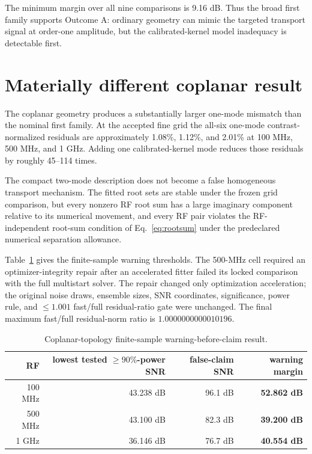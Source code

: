 \documentclass[11pt]{article}
\begin{document}
The minimum margin over all nine comparisons is 9.16 dB. Thus the broad first family supports Outcome A: ordinary geometry can mimic the targeted transport signal at order-one amplitude, but the calibrated-kernel model inadequacy is detectable first.

\section{Materially different coplanar result}

The coplanar geometry produces a substantially larger one-mode mismatch than the nominal first family. At the accepted fine grid the all-six one-mode contrast-normalized residuals are approximately 1.08\%, 1.12\%, and 2.01\% at 100 MHz, 500 MHz, and 1 GHz. Adding one calibrated-kernel mode reduces those residuals by roughly 45--114 times.

The compact two-mode description does not become a false homogeneous transport mechanism. The fitted root sets are stable under the frozen grid comparison, but every nonzero RF root sum has a large imaginary component relative to its numerical movement, and every RF pair violates the RF-independent root-sum condition of Eq.~\eqref{eq:rootsum} under the predeclared numerical separation allowance.

Table~\ref{tab:coplanar} gives the finite-sample warning thresholds. The 500-MHz cell required an optimizer-integrity repair after an accelerated fitter failed its locked comparison with the full multistart solver. The repair changed only optimization acceleration; the original noise draws, ensemble sizes, SNR coordinates, significance, power rule, and $\le1.001$ fast/full residual-ratio gate were unchanged. The final maximum fast/full residual-norm ratio is $1.0000000000010196$.

\begin{table}[H]
\centering
\caption{Coplanar-topology finite-sample warning-before-claim result.}
\label{tab:coplanar}
\begin{tabular}{rrrr}
\toprule
RF & lowest tested $\ge90\%$-power SNR & false-claim SNR & warning margin\\
\midrule
100 MHz & 43.238 dB & 96.1 dB & \textbf{52.862 dB}\\
500 MHz & 43.100 dB & 82.3 dB & \textbf{39.200 dB}\\
1 GHz & 36.146 dB & 76.7 dB & \textbf{40.554 dB}\\
\bottomrule
\end{tabular}
\end{table}
\end{document}
